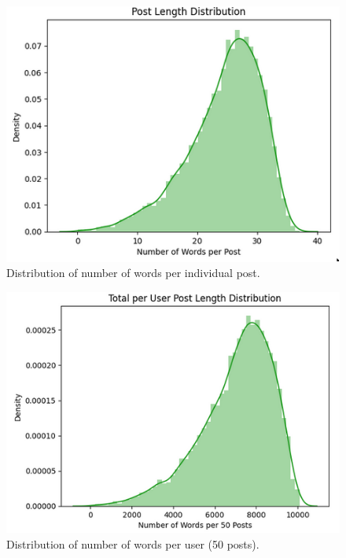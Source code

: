 \documentclass{article}
\begin{document}
\begin{figure}[ht]
\vskip 0.2in
\begin{center}
\centerline{\includegraphics[width=\columnwidth]{image3}}
\caption{Distribution of number of words per individual post.}
\label{post-length-dist}
\end{center}
\vskip -0.2in
\end{figure}

\begin{figure}[ht]
\vskip 0.2in
\begin{center}
\centerline{\includegraphics[width=\columnwidth]{image2}}
\caption{Distribution of number of words per user (50 posts).}
\label{50-post-length-dist}
\end{center}
\vskip -0.2in
\end{figure}
\end{document}
